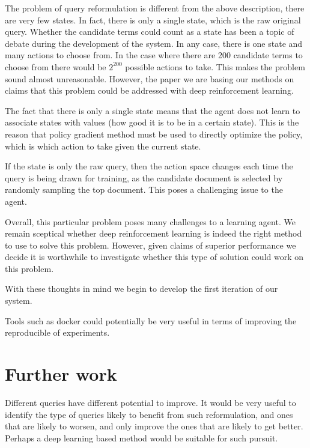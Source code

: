 The problem of query reformulation is different from the above description, there are very few states. In fact, there is only a single state, which is the raw original query. Whether the candidate terms could count as a state has been a topic of debate during the development of the system. In any case, there is one state and many actions to choose from. In the case where there are 200 candidate terms to choose from there would be $2^{200}$ possible actions to take. This makes the problem sound almost unreasonable. However, the paper we are basing our methods on claims that this problem could be addressed with deep reinforcement learning. 

The fact that there is only a single state means that the agent does not learn to associate states with values (how good it is to be in a certain state). This is the reason that policy gradient method must be used to directly optimize the policy, which is which action to take given the current state. 

If the state is only the raw query, then the action space changes each time the query is being drawn for training, as the candidate document is selected by randomly sampling the top document. This poses a challenging issue to the agent.

Overall, this particular problem poses many challenges to a learning agent. We remain sceptical whether deep reinforcement learning is indeed the right method to use to solve this problem. However, given claims of superior performance we decide it is worthwhile to investigate whether this type of solution could work on this problem. 

With these thoughts in mind we begin to develop the first iteration of our system.

Tools such as docker could potentially be very useful in terms of improving the reproducible of experiments. 

\section{Further work}


Different queries have different potential to improve. It would be very useful to identify the type of queries likely to benefit from such reformulation, and ones that are likely to worsen, and only improve the ones that are likely to get better. Perhaps a deep learning based method would be suitable for such pursuit.







